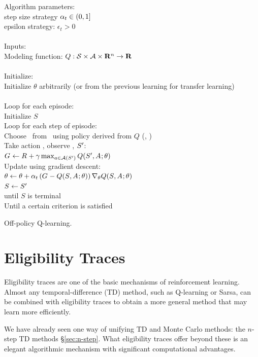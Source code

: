 \begin{table}
\beginalg
Algorithm parameters:\\
\> step size strategy $\alpha_{t} \in (0, 1]$\\
\> epsilon strategy: $\epsilon_t>0$\\
\\
Inputs:\\
\> Modeling function: $Q: \mathcal{S} \times \mathcal{A} \times \mathbf{R}^n \to \mathbf{R}$\\
\\
Initialize:\\
\> Initialize $\theta$ arbitrarily (or from the previous learning for transfer learning)\\
\\
Loop for each episode:\\
\> Initialize $S$\\
\> Loop for each step of episode:\\
\> \> Choose \action{}\ from \state{}\ using policy derived from $Q$ (\eg, \epsgreedy)\\
\> \> Take action \action{}, observe \reward{}, $S_{}'$:\\
\> \> \> $G_{{}} \leftarrow R_{} + \gamma \max_{a\in\mathcal{A}(S')}Q(S_{}',A_{}; \theta)$\\
\> \> Update using gradient descent:\\
\> \> \> $\theta \leftarrow  \theta + \alpha_{t} \left(G_{{}} - Q(S_{}, A_{}; \theta) \right) \nabla_\theta Q(S_{}, A_{}; \theta)$\\
\> \> $S \leftarrow S'$\\
\> until $S$ is terminal\\
Until a certain criterion is satisfied
\endalg
\caption{Off-policy Q-learning.}
\label{tab:alg:fcn-approx-q-learning}
\end{table}


\section{Eligibility Traces}



Eligibility traces are one of the basic mechanisms of reinforcement learning.
Almost any temporal-difference (TD) method,
such as Q-learning or Sarsa,
can be combined with eligibility traces to obtain a more general method that may learn more efficiently.

We have already seen one way of unifying TD and Monte Carlo methods:
the $n$-step TD methods \S\ref{sec:n-step}.
What eligibility traces offer beyond these is an elegant algorithmic mechanism
with significant computational advantages.

